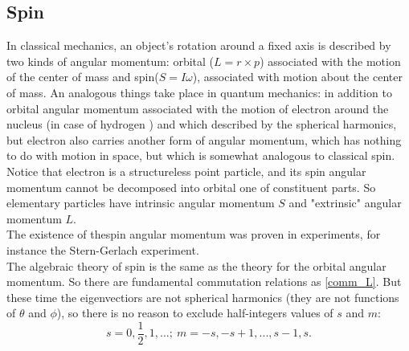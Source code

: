 \documentclass[a4paper, 14pt]{article}
\begin{document}



\subsection{Spin}
In classical mechanics, an object's rotation around a fixed axis  is described by two kinds of angular momentum: orbital ($L = r \times p$) associated with the motion of the center of mass and spin($S = I \omega$), associated with motion about the center of mass. An analogous things take place in quantum mechanics: in addition to orbital angular momentum associated with the motion of electron around the nucleus (in case of hydrogen ) and which  described by the spherical harmonics, but electron also carries another form of angular momentum, which has nothing to do with motion in space, but which is somewhat analogous to classical spin. Notice that electron is a structureless point particle, and its spin angular momentum cannot be decomposed into orbital one of constituent parts. So elementary particles have intrinsic angular momentum $S$ and "extrinsic" angular momentum $L.$\\
The existence of thespin angular momentum was proven in experiments, for instance the Stern-Gerlach experiment.\\
The algebraic  theory of  spin is the same as the theory for the orbital angular momentum. So there are fundamental commutation relations as \eqref{comm_L}.
But these time the eigenvectiors are not spherical harmonics (they are not functions of $\theta$ and $\phi$), so there is no reason to exclude half-integers values of $s$ and $m$:
$$s = 0, \frac{1}{2}, 1, ...;  ~ m = -s, -s+1,...,s-1, s. $$
\end{document}
